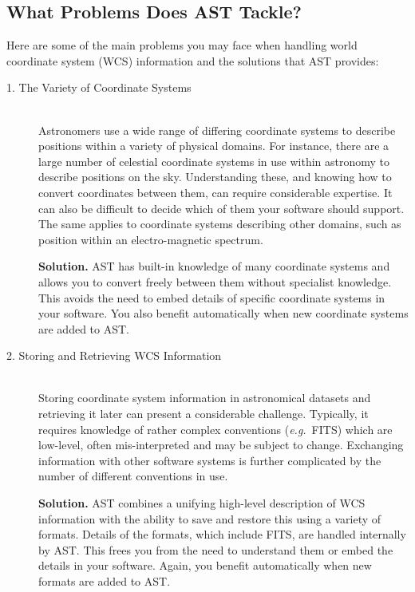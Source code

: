 \documentclass[twoside,11pt]{article}
\begin{document}

\subsection{What Problems Does AST Tackle?}

Here are some of the main problems you may face when handling world
coordinate system (WCS) information and the solutions that AST
provides:

\begin{description}
\item[1. The Variety of Coordinate Systems]\mbox{}\\
Astronomers use a wide range of differing coordinate systems to describe
positions within a variety of physical domains. For instance, there are a 
large number of celestial coordinate systems in use within astronomy to
describe positions on the sky. Understanding these, and knowing how to 
convert coordinates between them, can require considerable expertise. It 
can also be difficult to decide which of them your software should support.
The same applies to coordinate systems describing other domains, such as
position within an electro-magnetic spectrum.

{\bf{Solution.}} AST has built-in knowledge of many coordinate systems
and allows you to convert freely between them without specialist
knowledge. This avoids the need to embed details of specific
coordinate systems in your software. You also benefit automatically
when new coordinate systems are added to AST.

\item[2. Storing and Retrieving WCS Information]\mbox{}\\
Storing coordinate system information in astronomical datasets and
retrieving it later can present a considerable challenge. Typically,
it requires knowledge of rather complex conventions
({\em{e.g.}}\ FITS) which are low-level, often mis-interpreted and may
be subject to change. Exchanging information with other software
systems is further complicated by the number of different conventions
in use.

{\bf{Solution.}} AST combines a unifying high-level description of WCS
information with the ability to save and restore this using a variety
of formats. Details of the formats, which include FITS, are handled
internally by AST. This frees you from the need to understand them or
embed the details in your software. Again, you benefit automatically
when new formats are added to AST.


\end{description}
\end{document}
